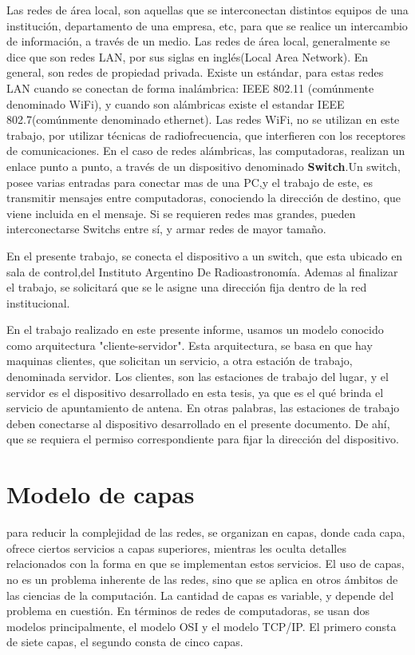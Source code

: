 Las redes de área local, son aquellas que se interconectan distintos equipos de una institución, departamento de una empresa, etc, para que se realice un intercambio de información, a través de un medio. Las redes de área local, generalmente se dice que son redes LAN, por sus siglas en inglés(Local Area Network).  En general, son redes de propiedad privada. Existe un estándar, para estas redes LAN cuando se conectan de forma inalámbrica: IEEE 802.11 (comúnmente denominado WiFi), y cuando son alámbricas existe el estandar IEEE 802.7(comúnmente denominado ethernet). Las redes WiFi, no se utilizan en este trabajo, por utilizar técnicas de radiofrecuencia, que interfieren con los receptores de comunicaciones.  
En el caso de redes alámbricas, las computadoras, realizan un enlace punto a punto, a través de un dispositivo denominado \textbf{Switch}.Un switch, posee varias entradas para conectar mas de una PC,y el trabajo de este, es transmitir mensajes entre computadoras, conociendo la dirección de destino, que viene incluida en el mensaje. Si se requieren redes mas grandes, pueden interconectarse Switchs entre sí, y armar redes de mayor tamaño. 


En el presente trabajo, se conecta el dispositivo a un switch, que esta ubicado en sala de control,del Instituto Argentino De Radioastronomía. Ademas al finalizar el trabajo, se solicitará que se le asigne una dirección fija dentro de la red institucional.  

En el trabajo realizado en este presente informe, usamos un modelo conocido como arquitectura "cliente-servidor". Esta arquitectura, se basa en que hay maquinas clientes, que solicitan un servicio, a otra estación de trabajo, denominada servidor. Los clientes, son las estaciones de trabajo del lugar, y el servidor es el dispositivo desarrollado en esta tesis, ya que es el qué brinda el servicio de apuntamiento de antena. En otras palabras, las estaciones de trabajo deben conectarse al dispositivo desarrollado en el presente documento. De ahí, que se requiera el permiso correspondiente para fijar la dirección del dispositivo.  




\section{Modelo de capas}

para reducir la complejidad de las redes, se organizan en capas, donde cada capa, ofrece ciertos servicios a capas superiores, mientras les oculta detalles relacionados con la forma en que se implementan estos servicios. El uso de capas, no es un problema inherente de las redes, sino que se aplica en otros ámbitos de las ciencias de la computación. La cantidad de capas es variable, y depende del problema en cuestión. En términos de redes de computadoras, se usan dos modelos principalmente, el modelo OSI y el modelo TCP/IP. El primero consta de siete capas, el segundo consta de cinco capas. 

